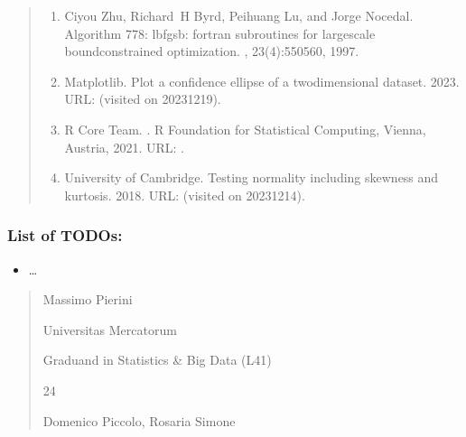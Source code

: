 \documentclass[letterpaper,10pt,english]{sphinxmanual}
\begin{document}
\begin{quote}
\begin{enumerate}
\item {} 
\sphinxAtStartPar
Ciyou Zhu, Richard H Byrd, Peihuang Lu, and Jorge Nocedal. Algorithm 778: l\sphinxhyphen{}bfgs\sphinxhyphen{}b: fortran subroutines for large\sphinxhyphen{}scale bound\sphinxhyphen{}constrained optimization. , 23(4):550\textendash{}560, 1997.

\item {} 
\sphinxAtStartPar
Matplotlib. Plot a confidence ellipse of a two\sphinxhyphen{}dimensional dataset. 2023. URL:  (visited on 2023\sphinxhyphen{}12\sphinxhyphen{}19).

\item {} 
\sphinxAtStartPar
R Core Team. . R Foundation for Statistical Computing, Vienna, Austria, 2021. URL: .

\item {} 
\sphinxAtStartPar
University of Cambridge. Testing normality including skewness and kurtosis. 2018. URL:  (visited on 2023\sphinxhyphen{}12\sphinxhyphen{}14).

\end{enumerate}
\end{quote}


\subsubsection{List of TODOs:}
\label{\detokenize{cubmods:list-of-todos}}\begin{itemize}
\item {} 
\sphinxAtStartPar
…

\end{itemize}
\begin{quote}\begin{description}
\sphinxAtStartPar
Massimo Pierini

\sphinxAtStartPar
Universitas Mercatorum

\sphinxAtStartPar
Graduand in Statistics \& Big Data (L41)

\sphinxhyphen{}24

\sphinxAtStartPar
Domenico Piccolo, Rosaria Simone

\sphinxAtStartPar
{}

\end{description}\end{quote}
\end{document}
